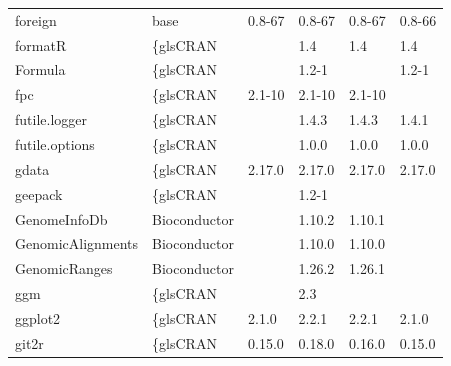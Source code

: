 \begin{longtable}{llllll}
foreign                       & base                      & 0.8-67      & 0.8-67      & 0.8-67         & 0.8-66            \\
\rowcolor{black!5}
formatR                       & \{gls{CRAN}                      &             & 1.4         & 1.4            & 1.4                \\
\rowcolor{black!10}
Formula                       & \{gls{CRAN}                      &             & 1.2-1       &                & 1.2-1             \\
\rowcolor{black!5}
fpc                           & \{gls{CRAN}                      & 2.1-10      & 2.1-10      & 2.1-10         &                    \\
\rowcolor{black!10}
futile.logger                 & \{gls{CRAN}                      &             & 1.4.3       & 1.4.3          & 1.4.1             \\
\rowcolor{black!5}
futile.options                & \{gls{CRAN}                      &             & 1.0.0       & 1.0.0          & 1.0.0              \\
\rowcolor{black!10}
gdata                         & \{gls{CRAN}                      & 2.17.0      & 2.17.0      & 2.17.0         & 2.17.0            \\
\rowcolor{black!5}
geepack                       & \{gls{CRAN}                      &             & 1.2-1       &                &                    \\
\rowcolor{black!10}
GenomeInfoDb                  & Bioconductor              &             & 1.10.2      & 1.10.1         &                   \\
\rowcolor{black!5}
GenomicAlignments             & Bioconductor              &             & 1.10.0      & 1.10.0         &                    \\
\rowcolor{black!10}
GenomicRanges                 & Bioconductor              &             & 1.26.2      & 1.26.1         &                   \\
\rowcolor{black!5}
ggm                           & \{gls{CRAN}                      &             & 2.3         &                &                    \\
\rowcolor{black!10}
ggplot2                       & \{gls{CRAN}                      & 2.1.0       & 2.2.1       & 2.2.1          & 2.1.0             \\
\rowcolor{black!5}
git2r                         & \{gls{CRAN}                      & 0.15.0      & 0.18.0      & 0.16.0         & 0.15.0             \\

\end{longtable}
